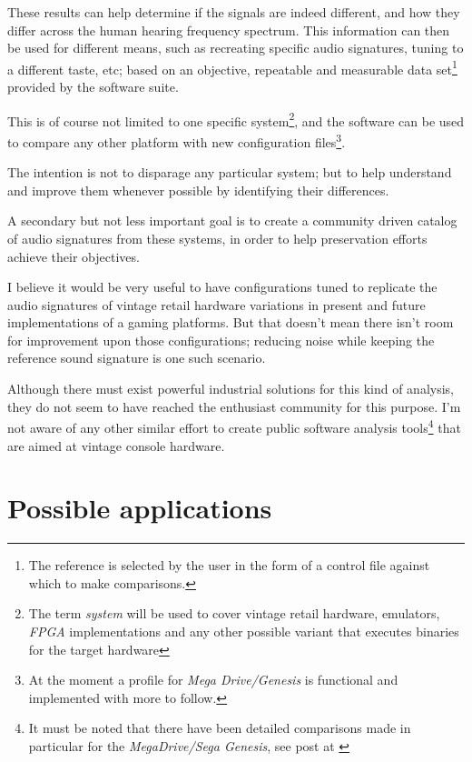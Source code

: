 \documentclass[10pt,a4paper]{report}
\begin{document}
These results can help determine if the signals are indeed different, and how they differ across the human hearing frequency spectrum. This information can then be used for different means, such as recreating specific audio signatures, tuning to a different taste, etc; based on an objective, repeatable and measurable data set\footnote{The reference is selected by the user in the form of a control file against which to make comparisons.} provided by the software suite.

This is of course not limited to one specific system\footnote{The term \textit{system} will be used to cover vintage retail hardware, emulators, \textit{FPGA} implementations and any other possible variant that executes binaries for the target hardware}, and the software can be used to compare any other platform with new configuration files\footnote{At the moment a profile for \textit{Mega Drive/Genesis} is functional and implemented with more to follow.}.

The intention is not to disparage any particular system; but to help understand and improve them whenever possible by identifying their differences.

A secondary but not less important goal is to create a community driven catalog of audio signatures from these systems, in order to help preservation efforts achieve their objectives.

I believe it would be very useful to have configurations tuned to replicate the audio signatures of vintage retail hardware variations in present and future implementations of a gaming platforms. But that doesn't mean there isn't room for improvement upon those configurations; reducing noise while keeping the reference sound signature is one such scenario.

Although there must exist powerful industrial solutions for this kind of analysis, they do not seem to have reached the enthusiast community for this purpose. I'm not aware of any other similar effort to create public software analysis tools\footnote{It must be noted that there have been detailed comparisons made in particular for the \textit{MegaDrive/Sega Genesis}, see post at \cite{genesisaudio}} that are aimed at vintage console hardware. 

\section{Possible applications}
\end{document}
